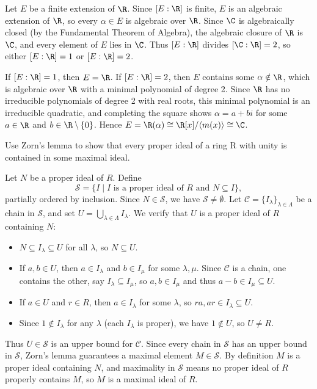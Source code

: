 \begin{solution}
  Let $E$ be a finite extension of $\R$. Since $[E : \R]$ is finite, $E$ is an algebraic extension of $\R$, so every $\alpha \in E$ is algebraic over $\R$. Since $\C$ is algebraically closed (by the Fundamental Theorem of Algebra), the algebraic closure of $\R$ is $\C$, and every element of $E$ lies in $\C$. Thus $[E : \R]$ divides $[\C : \R] = 2$, so either $[E : \R] = 1$ or $[E : \R] = 2$.

  If $[E : \R] = 1$, then $E = \R$. If $[E : \R] = 2$, then $E$ contains some $\alpha \notin \R$, which is algebraic over $\R$ with a minimal polynomial of degree 2. Since $\R$ has no irreducible polynomials of degree 2 with real roots, this minimal polynomial is an irreducible quadratic, and completing the square shows $\alpha = a + bi$ for some $a \in \R$ and $b \in \R \setminus \{0\}$. Hence $E = \R(\alpha) \cong \R[x]/\langle m(x) \rangle \cong \C$.
\end{solution}

\begin{problem}[40.38]
  Use Zorn's lemma to show that every proper ideal of a ring R with unity is contained in some maximal ideal.
\end{problem}

\begin{solution}
  Let $N$ be a proper ideal of $R$. Define
  \[%
    \mathcal{S} = \{ I \mid I \text{ is a proper ideal of } R \text{ and } N \subseteq I \}
  ,\]%
  partially ordered by inclusion. Since $N \in \mathcal{S}$, we have $\mathcal{S} \neq \emptyset$. Let $\mathcal{C} = \{I_\lambda\}_{\lambda \in \Lambda}$ be a chain in $\mathcal{S}$, and set $U = \bigcup_{\lambda \in \Lambda} I_\lambda$. We verify that $U$ is a proper ideal of $R$ containing $N$:
  \begin{itemize}
    \item $N \subseteq I_\lambda \subseteq U$ for all $\lambda$, so $N \subseteq U$.
    \item If $a, b \in U$, then $a \in I_\lambda$ and $b \in I_\mu$ for some $\lambda, \mu$. Since $\mathcal{C}$ is a chain, one contains the other, say $I_\lambda \subseteq I_\mu$, so $a, b \in I_\mu$ and thus $a - b \in I_\mu \subseteq U$.
    \item If $a \in U$ and $r \in R$, then $a \in I_\lambda$ for some $\lambda$, so $ra, ar \in I_\lambda \subseteq U$.
    \item Since $1 \notin I_\lambda$ for any $\lambda$ (each $I_\lambda$ is proper), we have $1 \notin U$, so $U \neq R$.
  \end{itemize}
  Thus $U \in \mathcal{S}$ is an upper bound for $\mathcal{C}$. Since every chain in $\mathcal{S}$ has an upper bound in $\mathcal{S}$, Zorn's lemma guarantees a maximal element $M \in \mathcal{S}$. By definition $M$ is a proper ideal containing $N$, and maximality in $\mathcal{S}$ means no proper ideal of $R$ properly contains $M$, so $M$ is a maximal ideal of $R$.
\end{solution}

